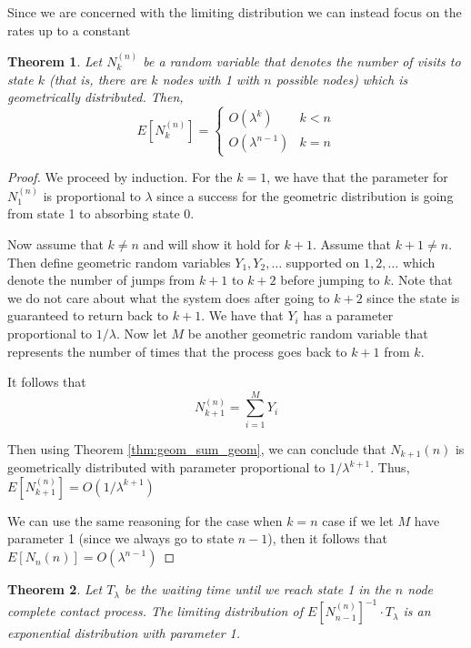 \documentclass{article}
\theoremstyle{plain}
\newtheorem{theorem}{Theorem}[section]
\theoremstyle{definition}
\theoremstyle{remark}
\numberwithin{equation}{section}
\begin{document}
Since we are concerned with the limiting distribution we can instead focus on the rates up to a constant

\begin{theorem}
Let $N_k^{(n)}$ be a random variable that denotes the number of visits to state $k$ (that is, there are $k$ nodes with 1 with $n$ possible nodes) which is geometrically distributed. Then,
$$
E[N_k^{(n)}] = \begin{cases}
    O(\lambda^k) & k < n\\
    O(\lambda^{n - 1}) & k = n
\end{cases}
$$
\end{theorem}

\begin{proof}
We proceed by induction.
For the $k = 1$, we have that the parameter for $N_1^{(n)}$ is proportional to $\lambda$ since a success for the geometric distribution is going from state 1 to absorbing state 0.

Now assume that $k \not = n$ and will show it hold for $k + 1$.
Assume that $k + 1 \not = n$.
Then define geometric random variables $Y_1, Y_2, \ldots$ supported on $1,2,\ldots$ which denote the number of jumps from $k + 1$ to $k + 2$ before jumping to $k$.
Note that we do not care about what the system does after going to $k + 2$ since the state is guaranteed to return back to $k + 1$.
We have that $Y_i$ has a parameter proportional to $1/\lambda$.
Now let $M$ be another geometric random variable that represents the number of times that the process goes back to $k + 1$ from $k$.

It follows that
\begin{equation}
   N_{k + 1}^{(n)} = \sum_{i = 1}^M Y_i
\end{equation}

Then using Theorem \eqref{thm:geom_sum_geom}, we can conclude that $N_{k + 1}{(n)}$ is geometrically distributed with parameter proportional to $1/\lambda^{k + 1}$.
Thus, $E[N_{k + 1}^{(n)}] = O(1/\lambda^{k + 1})$

We can use the same reasoning for the case when $k = n$ case if we let $M$ have parameter 1 (since we always go to state $n - 1$), then it follows that $E[N_{n}{(n)}] = O(\lambda^{n - 1})$
\end{proof}

\begin{theorem}
Let $T_\lambda$ be the waiting time until we reach state 1 in the $n$ node complete contact process.
The limiting distribution of $E[N_{n-1}^{(n)}]^{-1} \cdot T_\lambda$ is an exponential distribution with parameter 1.
\end{theorem}
\end{document}
